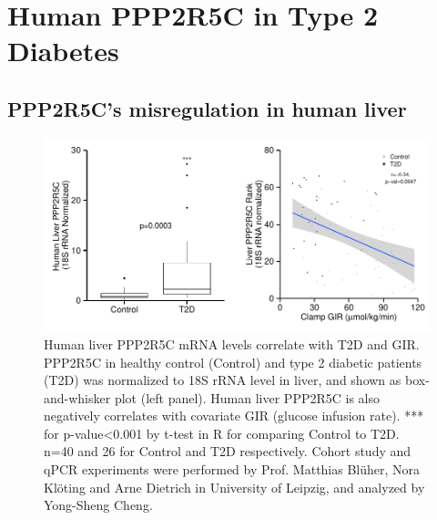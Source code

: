\section{Human PPP2R5C in Type 2 Diabetes}\label{sec:sec2.6}

\subsection{PPP2R5C's misregulation in human liver}

\begin{figure}[htbp]
\centering
\includegraphics[width=1\textwidth]{figs/fig2-60 human ppp2r5c vs t2d GIR.pdf}
\caption[Human PPP2R5C mRNA levels in human liver]{\footnotesize Human liver PPP2R5C mRNA levels correlate with T2D and GIR. PPP2R5C in healthy control (Control) and type 2 diabetic patients (T2D) was normalized to 18S rRNA level in liver, and shown as box-and-whisker plot (left panel). Human liver PPP2R5C is also negatively correlates with covariate GIR (glucose infusion rate). *** for p-value<0.001 by t-test in R for comparing Control to T2D. n=40 and 26 for Control and T2D respectively. Cohort study and qPCR experiments were performed by Prof. Matthias Bl\"uher, Nora Kl\"oting and Arne Dietrich in University of Leipzig, and analyzed by Yong-Sheng Cheng.}
\label{fig:fig2.60}
\end{figure}

